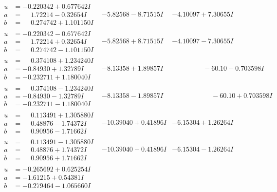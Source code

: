 \documentclass[1p]{elsarticle_modified}
\theoremstyle{definition}
\begin{document}
$$\begin{array}{c|c|c}
\begin{aligned}
u &= -0.220342 + 0.677642 I \\
a &= \phantom{-}1.72214 - 0.32654 I \\
b &= \phantom{-}0.274742 + 1.101150 I\end{aligned}
 & -5.82568 - 8.71515 I & -4.10097 + 7.30655 I \\ \hline\begin{aligned}
u &= -0.220342 - 0.677642 I \\
a &= \phantom{-}1.72214 + 0.32654 I \\
b &= \phantom{-}0.274742 - 1.101150 I\end{aligned}
 & -5.82568 + 8.71515 I & -4.10097 - 7.30655 I \\ \hline\begin{aligned}
u &= \phantom{-}0.374108 + 1.234240 I \\
a &= -0.84930 + 1.32789 I \\
b &= -0.232711 + 1.180040 I\end{aligned}
 & -8.13358 + 1.89857 I & \phantom{-0.000000 }      -6
0. 10   - 0.703598 I \\ \hline\begin{aligned}
u &= \phantom{-}0.374108 - 1.234240 I \\
a &= -0.84930 - 1.32789 I \\
b &= -0.232711 - 1.180040 I\end{aligned}
 & -8.13358 - 1.89857 I & \phantom{-0.000000 -}     -6
0. 10   + 0.703598 I \\ \hline\begin{aligned}
u &= \phantom{-}0.113491 + 1.305880 I \\
a &= \phantom{-}0.48876 - 1.74372 I \\
b &= \phantom{-}0.90956 - 1.71662 I\end{aligned}
 & -10.39040 + 0.41896 I & -6.15304 + 1.26264 I \\ \hline\begin{aligned}
u &= \phantom{-}0.113491 - 1.305880 I \\
a &= \phantom{-}0.48876 + 1.74372 I \\
b &= \phantom{-}0.90956 + 1.71662 I\end{aligned}
 & -10.39040 - 0.41896 I & -6.15304 - 1.26264 I \\ \hline\begin{aligned}
u &= -0.265692 + 0.625254 I \\
a &= -1.61215 + 0.54381 I \\
b &= -0.279464 - 1.065660 I\end{aligned}

\end{array}$$
\end{document}
